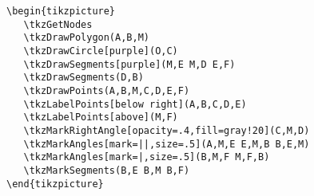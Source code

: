 \begin{verbatim}
\begin{tikzpicture}
   \tkzGetNodes
   \tkzDrawPolygon(A,B,M)
   \tkzDrawCircle[purple](O,C)
   \tkzDrawSegments[purple](M,E M,D E,F)
   \tkzDrawSegments(D,B)
   \tkzDrawPoints(A,B,M,C,D,E,F)
   \tkzLabelPoints[below right](A,B,C,D,E)
   \tkzLabelPoints[above](M,F)
   \tkzMarkRightAngle[opacity=.4,fill=gray!20](C,M,D)
   \tkzMarkAngles[mark=||,size=.5](A,M,E E,M,B B,E,M)
   \tkzMarkAngles[mark=|,size=.5](B,M,F M,F,B)
   \tkzMarkSegments(B,E B,M B,F)
\end{tikzpicture}
\end{verbatim}



\endinput
